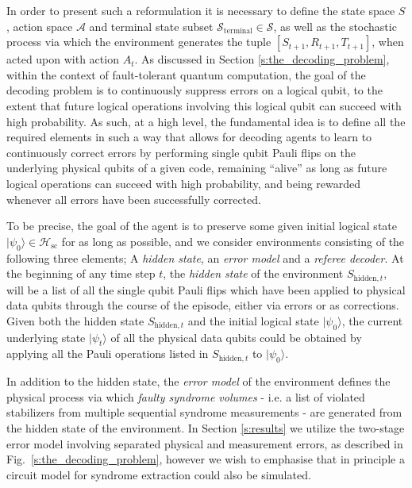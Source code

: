 \documentclass[twocolumn,preprintnumbers,amsmath,amssymb,notitlepage,nofootinbib,longbibliography,superscriptaddress,aps,pra,10pt]{revtex4-1}
\begin{document}
	In order to present such a reformulation it is necessary to define the state space $S$, action space $\mathcal{A}$ and terminal state subset $\mathcal{S}_\mathrm{terminal} \in \mathcal{S}$, as well as the stochastic process via which the environment generates the tuple $[S_{t+1},R_{t+1},T_{t+1}]$,  when acted upon with action $A_t$. 
	As discussed in Section \ref{s:the_decoding_problem}, within the context of fault-tolerant quantum computation, the goal of the decoding problem is to continuously suppress errors on a logical qubit, to the extent that future logical operations involving this logical qubit can succeed with high probability.
	As such, at a high level, the fundamental idea is to define all the required elements in such a way that allows for decoding agents to learn to continuously correct errors by performing single qubit Pauli flips on the underlying physical qubits of a given code, remaining ``alive'' as long as future logical operations can succeed with high probability, and being rewarded whenever all errors have been successfully corrected.

	To be precise, the goal of the agent is to preserve some given initial logical state $|\psi_0\rangle \in \mathcal{H}_{\mathrm{sc}}$ for as long as possible, and we consider environments consisting of the following three elements; A \emph{hidden state}, an \emph{error model} and a \emph{referee decoder}.
	At the beginning of any time step $t$, the \emph{hidden state} of the environment $S_{\mathrm{hidden},t}$, will be a list of all the single qubit Pauli flips which have been applied to physical data qubits through the course of the episode, either via errors or as corrections.
	Given both the hidden state $S_{\mathrm{hidden},t}$ and the initial logical state $|\psi_0\rangle$, the current underlying state $|\psi_t\rangle$ of all the physical data qubits could be obtained by applying all the Pauli operations listed in $S_{\mathrm{hidden},t}$ to $|\psi_0\rangle$.

	In addition to the hidden state, the \emph{error model} of the environment defines the physical process via which \emph{faulty syndrome volumes} - i.e. a list of violated stabilizers from multiple sequential syndrome measurements - are generated from the hidden state of the environment. 
	In Section \ref{s:results} we utilize the two-stage error model involving separated physical and measurement errors, as described in Fig.~\ref{s:the_decoding_problem}, however we wish to emphasise that in principle a circuit model for syndrome extraction could also be simulated.
\end{document}
